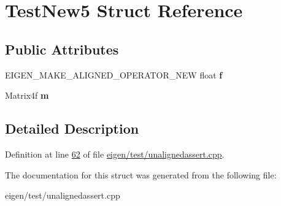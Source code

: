 \hypertarget{struct_test_new5}{}\section{Test\+New5 Struct Reference}
\label{struct_test_new5}
\subsection*{Public Attributes}
\begin{DoxyCompactItemize}
\item 
\mbox{\label{struct_test_new5_a6b27f8d9b9979282673374b4d352919e}} 
E\+I\+G\+E\+N\+\_\+\+M\+A\+K\+E\+\_\+\+A\+L\+I\+G\+N\+E\+D\+\_\+\+O\+P\+E\+R\+A\+T\+O\+R\+\_\+\+N\+EW float {\bfseries f}
\item 
\mbox{\label{struct_test_new5_a2b1379c44717e9a75f7bc29ad4ad8249}} 
Matrix4f {\bfseries m}
\end{DoxyCompactItemize}


\subsection{Detailed Description}


Definition at line \hyperlink{eigen_2test_2unalignedassert_8cpp_source_l00062}{62} of file \hyperlink{eigen_2test_2unalignedassert_8cpp_source}{eigen/test/unalignedassert.\+cpp}.



The documentation for this struct was generated from the following file\+:\begin{DoxyCompactItemize}
\item 
eigen/test/unalignedassert.\+cpp\end{DoxyCompactItemize}
